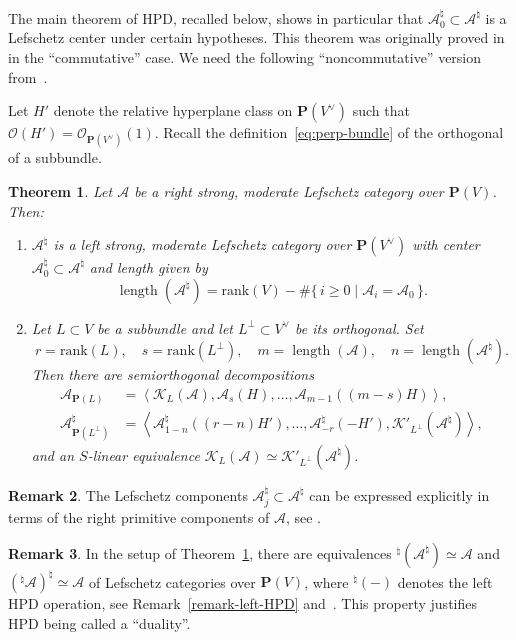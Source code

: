 \documentclass[11pt, reqno]{amsart}
\numberwithin{equation}{section}
\theoremstyle{plain}
\newtheorem{theorem}{Theorem}[section]
\theoremstyle{definition}
\newtheorem{remark}[theorem]{Remark}
\DeclareMathOperator{\length}{\mathrm{length}}
\newcommand{\hpd}{{\natural}}
\newcommand{\svee}{\scriptscriptstyle\vee}
\newcommand{\cAd}{\cA^\hpd}
\newcommand{\llangle}{\left \langle}
\newcommand{\rrangle}{\right \rangle}
\newcommand{\vV}{V^{\svee}}
\newcommand{\rank}{\mathrm{rank}}
\newcommand{\cO}{\mathcal{O}}
\newcommand{\cA}{\mathcal{A}}
\newcommand{\cK}{\mathcal{K}}
\newcommand{\bP}{\mathbf{P}}
\begin{document}
The main theorem of HPD, recalled below, shows in particular that $\cAd_0 \subset \cAd$ 
is a Lefschetz center under certain hypotheses. 
This theorem was originally proved in \cite{kuznetsov-hpd} in the ``commutative'' case. 
We need the following ``noncommutative'' version from~\cite[Theorem~8.7]{NCHPD}.  

Let $H'$ denote the relative hyperplane class on $\bP(V^{\svee})$ 
such that~$\cO(H') = \cO_{\bP(\vV)}(1)$. 
Recall the definition~\eqref{eq:perp-bundle} of the orthogonal of a subbundle.

\begin{theorem}
\label{theorem-HPD} 
Let $\cA$ be a right strong, moderate Lefschetz category over $\bP(V)$. 
Then: 
\begin{enumerate}
\item 
\label{Cd-ld}
$\cAd$ is a left strong, moderate Lefschetz category over $\bP(\vV)$ with center $\cAd_0 \subset \cAd$ and 
length given by 
\begin{equation*}
\length(\cAd) = \rank(V) - \# \{ \, i \geq 0 \mid \cA_i = \cA_0 \, \}. 
\end{equation*}

\item \label{HPD-linear}  
Let $L \subset V$ be a subbundle and let $L^{\perp} \subset \vV$ be 
its orthogonal. 
Set 
\begin{equation*}
r = \rank(L), \quad s = \rank(L^{\perp}), \quad m = \length(\cA),  \quad n = \length(\cA^\hpd). 
\end{equation*} 
Then there are semiorthogonal decompositions 
\begin{align*}
\cA_{\bP(L)} 
& = \llangle \cK_L(\cA), 
\cA_s(H) , 
\dots, 
\cA_{m-1}((m-s)H)  \rrangle , 
\\
\cAd_{\bP(L^{\perp})} 
& = 
\llangle 
\cAd_{1-n}((r-n)H') , \dots, \cAd_{-r}(-H') , 
\cK'_{L^{\perp}}(\cAd) 
\rrangle , 
\end{align*}
and an $S$-linear equivalence $\cK_L(\cA) \simeq \cK'_{L^{\perp}}(\cAd)$. 

\end{enumerate}
\end{theorem} 

\begin{remark}
The Lefschetz components $\cAd_j \subset \cAd$ can be expressed explicitly in terms of the 
right primitive components of $\cA$, see \cite[\S7.2]{NCHPD}. 
\end{remark}


\begin{remark}
\label{remark-HPD-duality}
In the setup of Theorem~\ref{theorem-HPD}, 
there are equivalences ${^\hpd}(\cAd) \simeq \cA$ and $({^\hpd}\cA)^{\hpd} \simeq \cA$ 
of Lefschetz categories over $\bP(V)$, 
where ${^\hpd}(-)$ denotes the left HPD operation, 
see Remark~\ref{remark-left-HPD} and~\cite[Theorem 8.9]{NCHPD}.
This property justifies HPD being called a ``duality''.
\end{remark}
\end{document}
